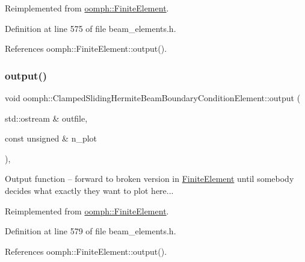 Reimplemented from \hyperlink{classoomph_1_1FiniteElement_a2ad98a3d2ef4999f1bef62c0ff13f2a7}{oomph\+::\+Finite\+Element}.



Definition at line 575 of file beam\+\_\+elements.\+h.



References oomph\+::\+Finite\+Element\+::output().

\mbox{\label{classoomph_1_1ClampedSlidingHermiteBeamBoundaryConditionElement_a7d6b2c570ba151ad86d136c070913d51}} 
\subsubsection{\texorpdfstring{output()}{output()}\hspace{0.1cm}{\footnotesize\ttfamily [2/4]}}
{\footnotesize\ttfamily void oomph\+::\+Clamped\+Sliding\+Hermite\+Beam\+Boundary\+Condition\+Element\+::output (\begin{DoxyParamCaption}\item[{std\+::ostream \&}]{outfile,  }\item[{const unsigned \&}]{n\+\_\+plot }\end{DoxyParamCaption})\hspace{0.3cm}{\ttfamily [inline]}, {\ttfamily [virtual]}}



Output function -- forward to broken version in \hyperlink{classoomph_1_1FiniteElement}{Finite\+Element} until somebody decides what exactly they want to plot here... 



Reimplemented from \hyperlink{classoomph_1_1FiniteElement_afa9d9b2670f999b43e6679c9dd28c457}{oomph\+::\+Finite\+Element}.



Definition at line 579 of file beam\+\_\+elements.\+h.



References oomph\+::\+Finite\+Element\+::output().

\mbox{\label{classoomph_1_1ClampedSlidingHermiteBeamBoundaryConditionElement_a820b232abacf508b9e8cbcad94f77755}} 
